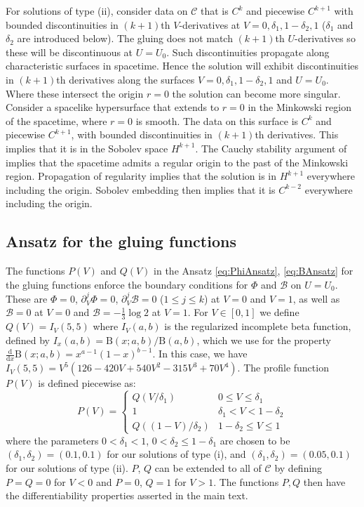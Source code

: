 \documentclass[prl,twocolumn,superscriptaddress,nofootinbib]{revtex4-2}
\begin{document}
For solutions of type (ii), consider data on $\mathcal{C}$ that is $C^k$ and piecewise $C^{k+1}$ with bounded discontinuities in $(k+1)$th $V$-derivatives at $V=0,\delta_1,1-\delta_2,1$ ($\delta_1$ and $\delta_2$ are introduced below). The gluing does not match $(k+1)$th $U$-derivatives so these will be discontinuous at $U=U_0$. Such discontinuities propagate along characteristic surfaces in spacetime. Hence the solution will exhibit discontinuities in $(k+1)$th derivatives along the surfaces $V=0,\delta_1,1-\delta_2,1$ and $U=U_0$. Where these intersect the origin $r=0$ the solution can become more singular. Consider a spacelike hypersurface that extends to $r=0$ in the Minkowski region of the spacetime, where $r=0$ is smooth. The data on this surface is $C^k$ and piecewise $C^{k+1}$, with bounded discontinuities in $(k+1)$th derivatives. This implies that it is in the Sobolev space $H^{k+1}$. The Cauchy stability argument of \cite{Kehle:2022uvc} implies that the spacetime admits a regular origin to the past of the Minkowski region. Propagation of regularity implies that the solution is in $H^{k+1}$ everywhere including the origin. Sobolev embedding then implies that it is $C^{k-2}$ everywhere including the origin.

\subsection{Ansatz for the gluing functions}

The functions $P(V)$ and $Q(V)$ in the Ansatz \eqref{eq:PhiAnsatz}, \eqref{eq:BAnsatz} for the gluing functions enforce the boundary conditions for $\Phi$ and $\mathcal{B}$ on $U=U_0$. These are $\Phi=0$, $\partial_V^j\Phi=0$, $\partial_V^j\mathcal{B}=0$ ($1\leq j \leq k$) at $V=0$ and $V=1$, as well as $\mathcal{B}=0$ at $V=0$ and $\mathcal{B}=-\frac{1}{3}\log 2$ at $V=1$. For $V \in [0,1]$ we define $Q(V)=I_V(5,5)$ where $I_V(a,b)$ is the regularized incomplete beta function, defined by $I_x(a,b)=\mathrm{B}(x;a,b)/\mathrm{B}(a,b)$, which we use for the property $\frac{\mathrm{d}}{\mathrm{d}x}\mathrm{B}(x;a,b)=x^{a-1}(1-x)^{b-1}$. In this case, we have $I_V(5,5)=V^5(126-420V+540V^2-315V^3+70V^4)$. The profile function $P(V)$ is defined piecewise as:
\begin{equation}
P(V) = \begin{cases}
    Q(V/\delta_1) & 0 \leq V \leq \delta_1\\
    1 & \delta_1 <V<1-\delta_2 \\
    Q((1-V)/\delta_2) & 1-\delta_2 \leq V\leq 1
\end{cases}
\end{equation}
where the parameters $0<\delta_1<1$, $0<\delta_2\leq1-\delta_1$ are chosen to be $(\delta_1,\delta_2)=(0.1,0.1)$ for our solutions of type (i), and $(\delta_1,\delta_2)=(0.05,0.1)$ for our solutions of type (ii). $P$, $Q$ can be extended to all of $\mathcal{C}$ by defining $P=Q=0$ for $V<0$ and $P=0$, $Q=1$ for $V>1$. The functions $P,Q$ then have the differentiability properties asserted in the main text.
\end{document}

